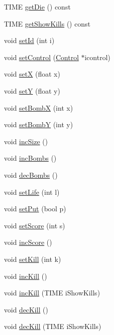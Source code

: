 \begin{DoxyCompactItemize}
\item 
T\-I\-M\-E \hyperlink{class_player_a21745d8c82684a875a22609070c814cb}{get\-Die} () const 
\item 
T\-I\-M\-E \hyperlink{class_player_a591f6c56e5779c24f5477fc8b5d926e9}{get\-Show\-Kills} () const 
\item 
void \hyperlink{class_player_aa2cb5c8fe89f6f37f99abe6df7199fc1}{set\-Id} (int i)
\item 
void \hyperlink{class_player_a03591edbf27ba278d59af89e7fce4c32}{set\-Control} (\hyperlink{class_control}{Control} $\ast$icontrol)
\item 
void \hyperlink{class_player_a8b75c659b6f39a5abb564f29fc856ed4}{set\-X} (float x)
\item 
void \hyperlink{class_player_aeb1f6a2fee6b2ce819fed37fe9f21890}{set\-Y} (float y)
\item 
void \hyperlink{class_player_af3e70ea08d33b6c551d8777fafd677ae}{set\-Bomb\-X} (int x)
\item 
void \hyperlink{class_player_ad1742f6e29e3589746a59bad9de7e5f3}{set\-Bomb\-Y} (int y)
\item 
void \hyperlink{class_player_a0be84429f8bd31b22fae60f943affc1d}{inc\-Size} ()
\item 
void \hyperlink{class_player_abce1145d360ac0d240a78d5d4ea92dd3}{inc\-Bombs} ()
\item 
void \hyperlink{class_player_a132902f4b3306708346e22b4338428d4}{dec\-Bombs} ()
\item 
void \hyperlink{class_player_a4cdcb55d3d63a2ee67a01526a8a00a24}{set\-Life} (int l)
\item 
void \hyperlink{class_player_a0932a3bfeecbad1f64a9ecf364de1da8}{set\-Put} (bool p)
\item 
void \hyperlink{class_player_a85509b879f09e56aef34a09f0ac8d6df}{set\-Score} (int s)
\item 
void \hyperlink{class_player_a86da21ed2e4b6e6dcd0609f4666e3f98}{inc\-Score} ()
\item 
void \hyperlink{class_player_adc5ca4d3051a2240b40e9e8eeaf3919d}{set\-Kill} (int k)
\item 
void \hyperlink{class_player_ab0ff3a991f415db0c754bd15ef7f7632}{inc\-Kill} ()
\item 
void \hyperlink{class_player_a2a63a9b8decaf0254d657bf575f55c73}{inc\-Kill} (T\-I\-M\-E i\-Show\-Kills)
\item 
void \hyperlink{class_player_a41d67486b2e82e32286ca93f58f266be}{dec\-Kill} ()
\item 
void \hyperlink{class_player_a3be7e0463c2ac7c8ebd5bdf218ffa945}{dec\-Kill} (T\-I\-M\-E i\-Show\-Kills)

\end{DoxyCompactItemize}
